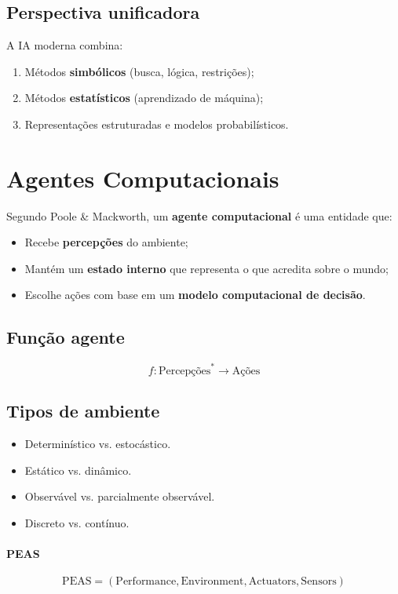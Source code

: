 \documentclass[9pt,a4paper]{extarticle}
\begin{document}
\subsection*{Perspectiva unificadora}
A IA moderna combina:
\begin{enumerate}[label=(\roman*)]
  \item Métodos \textbf{simbólicos} (busca, lógica, restrições);
  \item Métodos \textbf{estatísticos} (aprendizado de máquina);
  \item Representações estruturadas e modelos probabilísticos.
\end{enumerate}

\section{Agentes Computacionais}

Segundo Poole \& Mackworth, um \textbf{agente computacional} é uma entidade que:
\begin{itemize}
  \item Recebe \textbf{percepções} do ambiente;
  \item Mantém um \textbf{estado interno} que representa o que acredita sobre o mundo;
  \item Escolhe ações com base em um \textbf{modelo computacional de decisão}.
\end{itemize}

\subsection*{Função agente}
\[
f: \text{Percepções}^* \rightarrow \text{Ações}
\]

\subsection*{Tipos de ambiente}
\begin{itemize}
  \item Determinístico vs. estocástico.
  \item Estático vs. dinâmico.
  \item Observável vs. parcialmente observável.
  \item Discreto vs. contínuo.
\end{itemize}

\paragraph{PEAS}
\[
\text{PEAS} = (\text{Performance}, \text{Environment}, \text{Actuators}, \text{Sensors})
\]
\end{document}
